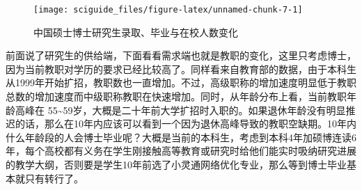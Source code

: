 \documentclass[]{tufte-book}
\begin{document}
\begin{figure}
\texttt{[image: sciguide\_files/figure-latex/unnamed-chunk-7-1]} \caption[中国硕士博士研究生录取、毕业与在校人数变化]{中国硕士博士研究生录取、毕业与在校人数变化}\label{fig:unnamed-chunk-7}
\end{figure}

前面说了研究生的供给端，下面看看需求端也就是教职的变化，这里只考虑博士，因为当前教职对学历的要求已经比较高了。同样看来自教育部的数据，由于本科生从1999年开始扩招，教职数也一直增加。不过，高级职称的增加速度明显低于教职总数的增加速度而中级职称教职在快速增加。同时，从年龄分布上看，当前教职年龄高峰在 55\textasciitilde59岁，大概是二十年前大学扩招时入职的。如果退休年龄没有明显推迟的话，那么在10年内应该可以看到一个因为退休高峰导致的教职空缺期。10年内什么年龄段的人会博士毕业呢？大概是当前的本科生，考虑到本科4年加硕博连读6年，每个高校都有义务在学生刚接触高等教育或研究时给他们能实时吸纳研究进展的教学大纲，否则要是学生10年前选了小灵通网络优化专业，那么等到博士毕业基本就只有转行了。
\end{document}
